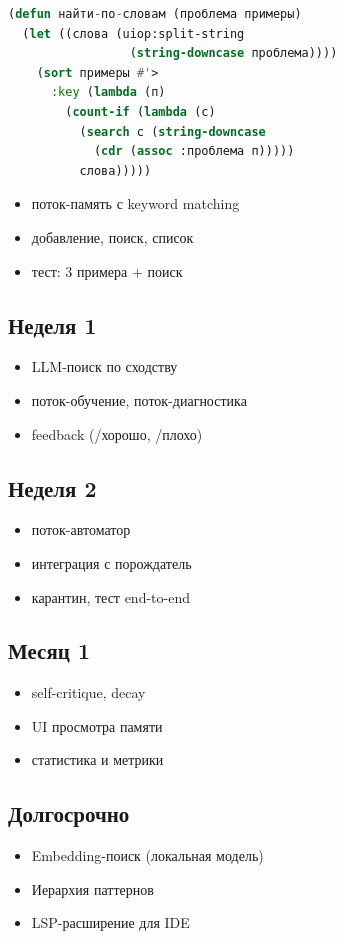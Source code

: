 \documentclass[10pt, oneside]{article}
\begin{document}
\begin{lstlisting}[language=CommonLisp,caption={Поиск без LLM для быстрого старта}]
(defun найти-по-словам (проблема примеры)
  (let ((слова (uiop:split-string
                 (string-downcase проблема))))
    (sort примеры #'>
      :key (lambda (п)
        (count-if (lambda (с)
          (search с (string-downcase
            (cdr (assoc :проблема п)))))
          слова)))))
\end{lstlisting}

\begin{itemize}
  \item[\checkmark] поток-память с keyword matching
  \item[\checkmark] добавление, поиск, список
  \item[\checkmark] тест: 3 примера + поиск
\end{itemize}

\subsection{Неделя 1}
\begin{itemize}
  \item LLM-поиск по сходству
  \item поток-обучение, поток-диагностика
  \item feedback (/хорошо, /плохо)
\end{itemize}

\subsection{Неделя 2}
\begin{itemize}
  \item поток-автоматор
  \item интеграция с порождатель
  \item карантин, тест end-to-end
\end{itemize}

\subsection{Месяц 1}
\begin{itemize}
  \item self-critique, decay
  \item UI просмотра памяти
  \item статистика и метрики
\end{itemize}

\subsection{Долгосрочно}
\begin{itemize}
  \item Embedding-поиск (локальная модель)
  \item Иерархия паттернов
  \item LSP-расширение для IDE
\end{itemize}
\end{document}
